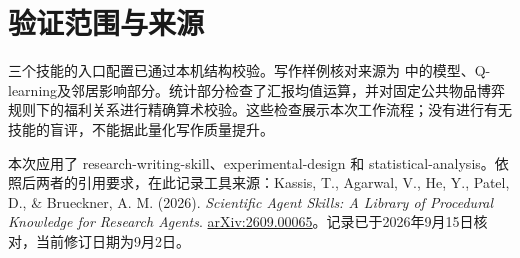 \documentclass[UTF8,fontset=fandol,zihao=-4]{ctexart}
\begin{document}
\section{验证范围与来源}
三个技能的入口配置已通过本机结构校验。写作样例核对来源为  中的模型、Q-learning及邻居影响部分。统计部分检查了汇报均值运算，并对固定公共物品博弈规则下的福利关系进行精确算术校验。这些检查展示本次工作流程；没有进行有无技能的盲评，不能据此量化写作质量提升。

本次应用了 research-writing-skill、experimental-design 和 statistical-analysis。依照后两者的引用要求，在此记录工具来源：Kassis, T., Agarwal, V., He, Y., Patel, D., \& Brueckner, A. M. (2026). \textit{Scientific Agent Skills: A Library of Procedural Knowledge for Research Agents}. \href{https://doi.org/10.48550/arXiv.2609.00065}{arXiv:2609.00065}。记录已于2026年9月15日核对，当前修订日期为9月2日。
\end{document}
